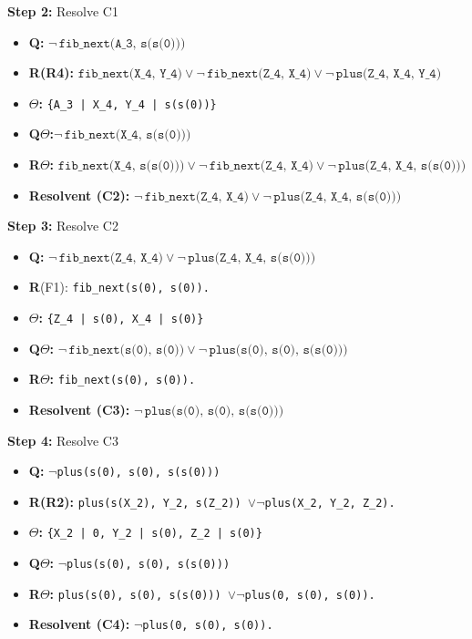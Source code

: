 \documentclass[10pt, a4paper]{article}
\begin{document}
\textbf{Step 2:} Resolve C1
\begin{itemize}
    \item \textbf{Q:} \( \lnot\,\texttt{fib\_next(A\_3, s(s(0)))} \)
    \item \textbf{R(R4):} \( \texttt{fib\_next(X\_4, Y\_4)} \lor \lnot\,\texttt{fib\_next(Z\_4, X\_4)} \lor \lnot\,\texttt{plus(Z\_4, X\_4, Y\_4)} \)
    \item \textbf{\(\Theta\):} \texttt{\{A\_3 | X\_4, Y\_4 | s(s(0))\}}
    \item \textbf{Q$\Theta$:}\( \lnot\,\texttt{fib\_next(X\_4, s(s(0)))} \)
    \item \textbf{R\(\Theta\):} \( \texttt{fib\_next(X\_4, s(s(0)))} \lor \lnot\,\texttt{fib\_next(Z\_4, X\_4)} \lor \lnot\,\texttt{plus(Z\_4, X\_4, s(s(0)))} \)
    \item \textbf{Resolvent (C2):} \( \lnot\,\texttt{fib\_next(Z\_4, X\_4)} \lor \lnot\,\texttt{plus(Z\_4, X\_4, s(s(0)))} \)\\
\end{itemize}


\textbf{Step 3:} Resolve C2
\begin{itemize}
    \item \textbf{Q:} \( \lnot\,\texttt{fib\_next(Z\_4, X\_4)} \lor \lnot\,\texttt{plus(Z\_4, X\_4, s(s(0)))} \)
    \item \textbf{R}(F1): \texttt{fib\_next(s(0), s(0)).}
    \item \textbf{\(\Theta\):} \texttt{\{Z\_4 | s(0), X\_4 | s(0)\}}
    \item \textbf{Q\(\Theta\):} \( \lnot\,\texttt{fib\_next(s(0), s(0))} \lor \lnot\,\texttt{plus(s(0), s(0), s(s(0)))} \)
\item \textbf{R\(\Theta\):} \texttt{fib\_next(s(0), s(0)).}
    \item \textbf{Resolvent (C3):} \( \lnot\,\texttt{plus(s(0), s(0), s(s(0)))} \)\\
\end{itemize}


\textbf{Step 4:} Resolve C3 
\begin{itemize}
    \item \textbf{Q:} \texttt{$\lnot$plus(s(0), s(0), s(s(0)))}
    \item \textbf{R(R2):}  \texttt{plus(s(X\_2), Y\_2, s(Z\_2)) $\lor \lnot$plus(X\_2, Y\_2, Z\_2).}
    \item \textbf{$\Theta$:} \texttt{\{X\_2 | 0, Y\_2 | s(0), Z\_2 | s(0)\}}
    \item     \textbf{Q\(\Theta\):}  \texttt{$\lnot$plus(s(0), s(0), s(s(0)))}
    \item \textbf{R$\Theta$:} \texttt{plus(s(0), s(0), s(s(0))) $\lor \lnot$plus(0, s(0), s(0)).}
    \item \textbf{Resolvent (C4):} \texttt{$\lnot$plus(0, s(0), s(0)).}\\
\end{itemize}
\end{document}
